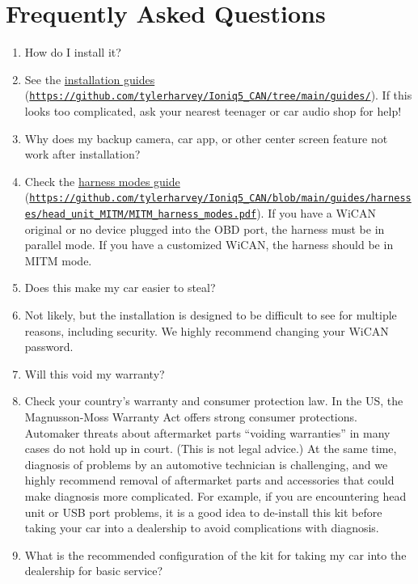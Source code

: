 \documentclass[superscriptaddress,onecolumn,floatfix]{revtex4-2}
\begin{document}
\section{Frequently Asked Questions}
\begin{enumerate}
  \item[Q:] How do I install it?
  \item[A:] See the \href{https://github.com/tylerharvey/Ioniq5_CAN/tree/main/guides/}{installation guides} (\href{https://github.com/tylerharvey/Ioniq5_CAN/tree/main/guides/}{\nolinkurl{https://github.com/tylerharvey/Ioniq5_CAN/tree/main/guides/}}). If this looks too complicated, ask your nearest teenager or car audio shop for help!
  \item[Q:] Why does my backup camera, car app, or other center screen feature not work after installation?
  \item[A:] Check the \href{https://github.com/tylerharvey/Ioniq5_CAN/blob/main/guides/harnesses/head_unit_MITM/MITM_harness_modes.pdf}{harness modes guide} (\href{https://github.com/tylerharvey/Ioniq5_CAN/blob/main/guides/harnesses/head_unit_MITM/MITM_harness_modes.pdf}{\nolinkurl{https://github.com/tylerharvey/Ioniq5_CAN/blob/main/guides/harnesses/head_unit_MITM/MITM_harness_modes.pdf}}). If you have a WiCAN original or no device plugged into the OBD port, the harness must be in parallel mode. If you have a customized WiCAN, the harness should be in MITM mode.
  \item[Q:] Does this make my car easier to steal?
  \item[A:] Not likely, but the installation is designed to be difficult to see for multiple reasons, including security. We highly recommend changing your WiCAN password. 
  \item[Q:] Will this void my warranty?
  \item[A:] Check your country's warranty and consumer protection law. In the US, the Magnusson-Moss Warranty Act offers strong consumer protections. Automaker threats about aftermarket parts ``voiding warranties'' in many cases do not hold up in court. (This is not legal advice.) At the same time, diagnosis of problems by an automotive technician is challenging, and we highly recommend removal of aftermarket parts and accessories that could make diagnosis more complicated. For example, if you are encountering head unit or USB port problems, it is a good idea to de-install this kit before taking your car into a dealership to avoid complications with diagnosis. 
  \item[Q:] What is the recommended configuration of the kit for taking my car into the dealership for basic service?

\end{enumerate}
\end{document}
